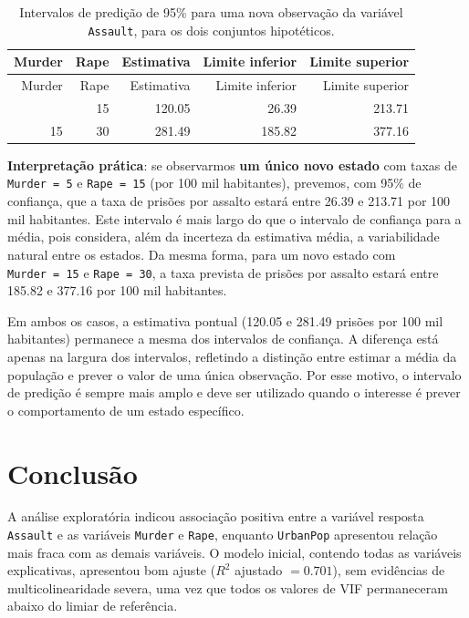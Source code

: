 \documentclass[a4paper]{modeloUFCG} %
\begin{document}
\begin{longtable}[]{@{}rrrrr@{}}
\caption{\label{tab:previsaoPredicao} Intervalos de predição de 95\% para uma nova observação da variável \protect\texttt{Assault}, para os dois conjuntos
hipotéticos.}\tabularnewline
\toprule\noalign{}
Murder & Rape & Estimativa & Limite inferior & Limite superior \\
\midrule\noalign{}
\endfirsthead
\toprule\noalign{}
Murder & Rape & Estimativa & Limite inferior & Limite superior \\
\midrule\noalign{}
\endhead
\bottomrule\noalign{}
\endlastfoot
5 & 15 & 120.05 & 26.39 & 213.71 \\
15 & 30 & 281.49 & 185.82 & 377.16 \\
\end{longtable}

\textbf{Interpretação prática}: se observarmos \textbf{um único novo estado} com taxas de \texttt{Murder\ =\ 5} e \texttt{Rape\ =\ 15} (por 100 mil habitantes),
prevemos, com 95\% de confiança, que a taxa de prisões por assalto estará entre 26.39 e 213.71
por 100 mil habitantes. Este intervalo é mais largo do que o intervalo de confiança para a média, pois considera, além da incerteza da
estimativa média, a variabilidade natural entre os estados. Da mesma forma, para um novo estado com \texttt{Murder\ =\ 15} e \texttt{Rape\ =\ 30}, a
taxa prevista de prisões por assalto estará entre 185.82 e 377.16 por 100 mil habitantes.

Em ambos os casos, a estimativa pontual (120.05 e 281.49 prisões por 100 mil habitantes) permanece
a mesma dos intervalos de confiança. A diferença está apenas na largura dos intervalos, refletindo a distinção entre estimar a média
da população e prever o valor de uma única observação. Por esse motivo, o intervalo de predição é sempre mais amplo e deve ser utilizado
quando o interesse é prever o comportamento de um estado específico.

\section{Conclusão}\label{conclusuxe3o}

A análise exploratória indicou associação positiva entre a variável resposta \texttt{Assault} e as variáveis \texttt{Murder} e \texttt{Rape}, enquanto
\texttt{UrbanPop} apresentou relação mais fraca com as demais variáveis. O modelo inicial, contendo todas as variáveis explicativas,
apresentou bom ajuste (\(R^2\) ajustado \(= 0.701\)), sem evidências de multicolinearidade severa,
uma vez que todos os valores de VIF permaneceram abaixo do limiar de referência.
\end{document}
